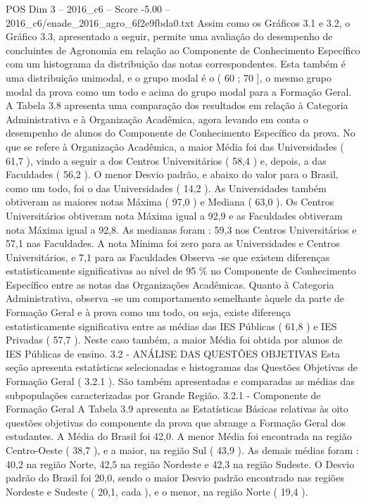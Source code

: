 \begin{textsample}{POS Dim 3 – 2016\_c6 – Score -5.00 – 2016\_c6/enade\_2016\_agro\_6f2e9fbda0.txt}
Assim como os Gráficos 3.1 e 3.2, o Gráfico 3.3, apresentado a seguir, permite uma avaliação do desempenho de concluintes de Agronomia em relação ao Componente de Conhecimento Específico com um histograma da distribuição das notas correspondentes.
Esta também é uma distribuição unimodal, e o grupo modal é o ( 60 ; 70 ], o mesmo grupo modal da prova como um todo e acima do grupo modal para a Formação Geral.
A Tabela 3.8 apresenta uma comparação dos resultados em relação à Categoria Administrativa e à Organização Acadêmica, agora levando em conta o desempenho de alunos do Componente de Conhecimento Específico da prova.
No que se refere à Organização Acadêmica, a maior Média foi das Universidades ( 61,7 ), vindo a seguir a dos Centros Universitários ( 58,4 ) e, depois, a das Faculdades ( 56,2 ).
O menor Desvio padrão, e abaixo do valor para o Brasil, como um todo, foi o das Universidades ( 14,2 ).
As Universidades também obtiveram as maiores notas Máxima ( 97,0 ) e Mediana ( 63,0 ).
Os Centros Universitários obtiveram nota Máxima igual a 92,9 e as Faculdades obtiveram nota Máxima igual a 92,8.
As medianas foram : 59,3 nos Centros Universitários e 57,1 nas Faculdades.
A nota Mínima foi zero para as Universidades e Centros Universitários, e 7,1 para as Faculdades Observa -se que existem diferenças estatisticamente significativas ao nível de 95 \% no Componente de Conhecimento Específico entre as notas das Organizações Acadêmicas.
Quanto à Categoria Administrativa, observa -se um comportamento semelhante àquele da parte de Formação Geral e à prova como um todo, ou seja, existe diferença estatisticamente significativa entre as médias das IES Públicas ( 61,8 ) e IES Privadas ( 57,7 ).
Neste caso também, a maior Média foi obtida por alunos de IES Públicas de ensino. 3.2 - ANÁLISE DAS QUESTÕES OBJETIVAS Esta seção apresenta estatísticas selecionadas e histogramas das Questões Objetivas de Formação Geral ( 3.2.1 ).
São também apresentadas e comparadas as médias das subpopulações caracterizadas por Grande Região. 3.2.1 - Componente de Formação Geral A Tabela 3.9 apresenta as Estatísticas Básicas relativas às oito questões objetivas do componente da prova que abrange a Formação Geral dos estudantes.
A Média do Brasil foi 42,0.
A menor Média foi encontrada na região Centro-Oeste ( 38,7 ), e a maior, na região Sul ( 43,9 ).
As demais médias foram : 40,2 na região Norte, 42,5 na região Nordeste e 42,3 na região Sudeste.
O Desvio padrão do Brasil foi 20,0, sendo o maior Desvio padrão encontrado nas regiões Nordeste e Sudeste ( 20,1, cada ), e o menor, na região Norte ( 19,4 ).

\end{textsample}
